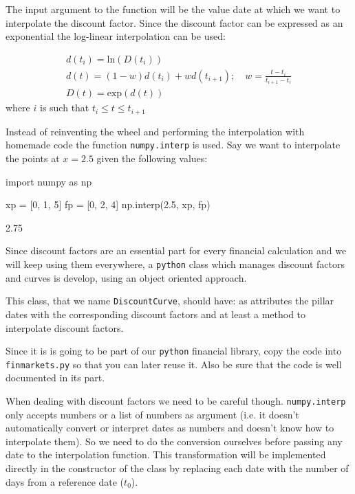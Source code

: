 The input argument to the function will be the value date at which we want to interpolate the discount factor. Since the discount factor can be expressed as an exponential the log-linear interpolation can be used:

\begin{equation}
\begin{gathered}
d(t_i)=\mathrm{ln}(D(t_i))\\
d(t) = (1-w)d(t_i) + wd(t_{i+1});\quad w=\frac{t-t_i}{t_{i+1}-t_i}\\
D(t) = \mathrm{exp}(d(t))
\end{gathered}
\end{equation}
where \(i\) is such that \(t_i \le t \le t_{i+1}\)

Instead of reinventing the wheel and performing the interpolation with homemade code the function \texttt{numpy.interp} is used. 
Say we want to interpolate the points at $x = 2.5$ given the following values:

\begin{ipython}
import numpy as np

xp = [0, 1, 5]
fp = [0, 2, 4]
np.interp(2.5, xp, fp)
\end{ipython}
\begin{ioutput}
2.75
\end{ioutput}

Since discount factors are an essential part for every financial calculation and we will keep using them everywhere, a \texttt{python} class which manages discount factors and curves is develop, using an object oriented approach.

\begin{finmarkets}
This class, that we name \texttt{DiscountCurve}, should have: as attributes the pillar dates with the corresponding discount factors and at least a method to interpolate discount factors.

Since it is is going to be part of our \texttt{python} financial library, copy the code into \texttt{finmarkets.py} so that you can later reuse it. Also be sure that the code is well documented in its part.	
\end{finmarkets}

When dealing with discount factors we need to be careful though. \texttt{numpy.interp} only accepts numbers or a list of numbers as argument (i.e. it doesn't automatically convert or interpret dates as numbers and doesn't know how to interpolate them). So we need to do the conversion ourselves before passing any date to the interpolation function. This transformation will be implemented directly in the constructor of the class by replacing each date with the number of days from a reference date ($t_0$).

